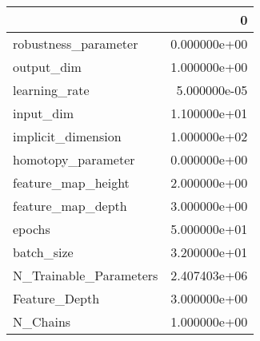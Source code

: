 \begin{tabular}{lr}
\toprule
{} &             0 \\
\midrule
robustness\_parameter   &  0.000000e+00 \\
output\_dim             &  1.000000e+00 \\
learning\_rate          &  5.000000e-05 \\
input\_dim              &  1.100000e+01 \\
implicit\_dimension     &  1.000000e+02 \\
homotopy\_parameter     &  0.000000e+00 \\
feature\_map\_height     &  2.000000e+00 \\
feature\_map\_depth      &  3.000000e+00 \\
epochs                 &  5.000000e+01 \\
batch\_size             &  3.200000e+01 \\
N\_Trainable\_Parameters &  2.407403e+06 \\
Feature\_Depth          &  3.000000e+00 \\
N\_Chains               &  1.000000e+00 \\
\bottomrule
\end{tabular}
